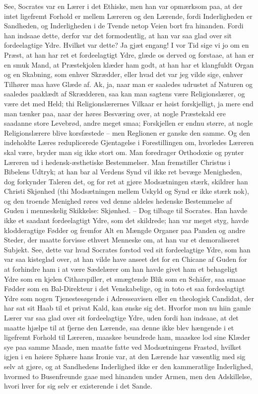 \documentclass[12pt,a4paper]{article}
\begin{document}
See, Socrates var en Lærer i det Ethiske, men han var opmærksom paa, at der intet ligefremt Forhold er mellem Læreren og den Lærende, fordi Inderligheden er Sandheden, og Inderligheden i de Tvende netop Veien bort fra hinanden. Fordi han indsaae dette, derfor var det formodentlig, at han var saa glad over sit fordeelagtige Ydre. Hvilket var dette? Ja gjæt engang! I vor Tid sige vi jo om en Præst, at han har ret et fordeelagtigt Ydre, glæde os derved og forstaae, at han er en smuk Mand, at Præstekjolen klæder ham godt, at han har et klangfuldt Organ og en Skabning, som enhver Skrædder, eller hvad det var jeg vilde sige, enhver Tilhører maa have Glæde af. Ak, ja, naar man er saaledes udrustet af Naturen og saaledes paaklædt af Skrædderen, saa kan man sagtens være Religionslærer, og være det med Held; thi Religionslærernes Vilkaar er høist forskjelligt, ja mere end man tænker paa, naar der høres Besværing over, at nogle Præstekald ere saadanne store Levebrød, andre meget smaa; Forskjellen er endnu større, at nogle Religionslærere blive korsfæstede – men Reglionen er ganske den samme. Og den indeholdte Læres reduplicerede Gjentagelse i Forestillingen om, hvorledes Læreren skal være, bryder man sig ikke stort om. Man foredrager Orthodoxie og pynter Læreren ud i hedensk-æsthetiske Bestemmelser. Man fremstiller Christus i Bibelens Udtryk; at han bar al Verdens Synd vil ikke ret bevæge Menigheden, dog forkynder Taleren det, og for ret at gjøre Modsætningen stærk, skildrer han Christi Skjønhed (thi Modsætningen mellem Uskyld og Synd er ikke stærk nok), og den troende Menighed røres ved denne aldeles hedenske Bestemmelse af Guden i menneskelig Skikkelse: Skjønhed. – Dog tilbage til Socrates. Han havde ikke et saadant fordeelagtigt Ydre, som det skildrede; han var meget styg, havde klodderagtige Fødder og fremfor Alt en Mængde Organer paa Panden og andre Steder, der maatte forvisse ethvert Menneske om, at han var et demoraliseret Subjekt. See, dette var hvad Socrates forstod ved sit fordeelagtige Ydre, som han var saa kisteglad over, at han vilde have anseet det for en Chicane af Guden for at forhindre ham i at være Sædelærer om han havde givet ham et behageligt Ydre som en kjelen Citharspiller, et smægtende Blik som en Schäfer, saa smaae Fødder som en Bal-Direkteur i det Venskabelige, og in toto et saa fordeelagtigt Ydre som nogen Tjenestesøgende i Adresseavisen eller en theologisk Candidat, der har sat sit Haab til et privat Kald, kan ønske sig det. Hvorfor mon nu hiin gamle Lærer var saa glad over sit fordeelagtige Ydre, uden fordi han indsaae, at det maatte hjælpe til at fjerne den Lærende, saa denne ikke blev hængende i et ligefremt Forhold til Læreren, maaskee beundrede ham, maaskee lod sine Klæder sye paa samme Maade, men maatte fatte ved Modsætningens Frastød, hvilket igjen i en høiere Sphære hans Ironie var, at den Lærende har væsentlig med sig selv at gjøre, og at Sandhedens Inderlighed ikke er den kammeratlige Inderlighed, hvormed to Busenfreunde gaae med hinanden under Armen, men den Adskillelse, hvori hver for sig selv er existerende i det Sande.
\end{document}
